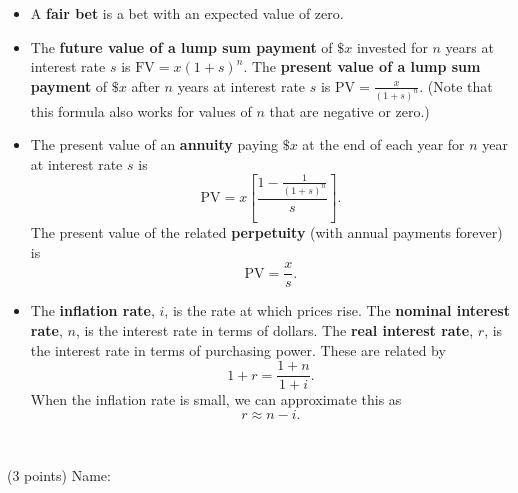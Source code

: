 \documentclass[twoside]{article}
\begin{document}
\begin{EXAM}
\begin{itemize}
\item A \textbf{fair bet} is a bet with an expected value of zero.

\item The \textbf{future value of a lump sum payment} of $\$x$ invested for $n$ years at interest rate $s$ is
$\displaystyle \mbox{FV} = x(1+s)^{n}$. The \textbf{present value of a lump sum payment} of $\$x$ after $n$ years at
interest rate $s$ is $\displaystyle \mbox{PV} = \frac{x}{(1+s)^{n}}.$ (Note that this formula also works for values of
$n$ that are negative or zero.)

\item The present value of an \textbf{annuity} paying $\$x$ at the end of each year for $n$ year at interest rate $s$ is
\[
\mbox{PV}=x\left[ \frac{1 - \displaystyle\frac{1}{(1+s)^n}}{s}\right].
\]
The present value of the related \textbf{perpetuity} (with annual payments forever) is
\[
\mbox{PV}=\frac{x}{s}.
\]

\item The \textbf{inflation rate}, $i$, is the rate at which prices rise. The \textbf{nominal interest rate}, $n$, is the
interest rate in terms of dollars. The \textbf{real interest rate}, $r$, is the interest rate in terms of purchasing
power. These are related by
\[
1+r=\frac{1+n}{1+i}.
\]
When the inflation rate is small, we can approximate this as
\[
r \approx n-i.
\]


\end{itemize}




\clearpage\
\clearpage
\end{EXAM}

\begin{EXAM}

\vspace*{-2cm}

\begin{flushright}
(3 points) Name: \hspace*{1in}

\medskip
\end{flushright}

\bigskip

\end{EXAM}
\end{document}

